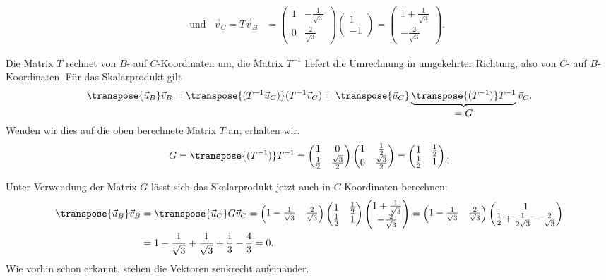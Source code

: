 \begin{loesung}
\begin{teilaufgaben}
\[\begin{aligned}
&
&\text{und}&
\vec v_C
=
T\vec v_B
&=
\begin{pmatrix}1&-\frac1{\sqrt{3}}\\0&\frac2{\sqrt{3}}\end{pmatrix}
\begin{pmatrix}1\\-1\end{pmatrix}
=
\begin{pmatrix} 1+\frac1{\sqrt{3}}\\-\frac2{\sqrt{3}} \end{pmatrix}.
\end{aligned}
\]
\item
Die Matrix $T$ rechnet von $B$- auf $C$-Koordinaten um, die Matrix $T^{-1}$
liefert die Umrechnung in umgekehrter Richtung, also von $C$- auf $B$-Koordinaten.
Für das Skalarprodukt gilt
\[
\transpose{\vec{u}_B} \vec v_B
=
\transpose{(T^{-1}\vec{u}_C)}(T^{-1}\vec v_C)
=
\transpose{\vec{u}_C}
\underbrace{ \transpose{(T^{-1})} T^{-1}}_{\displaystyle =G} \vec v_C.
\]
Wenden wir dies auf die oben berechnete Matrix $T$ an, erhalten wir:
\[
G
=
\transpose{(T^{-1})}T^{-1}
=
\begin{pmatrix}1&0\\\frac12&\frac{\sqrt{3}}2\end{pmatrix}
\begin{pmatrix}1&\frac12\\0&\frac{\sqrt{3}}2\end{pmatrix}
=
\begin{pmatrix} 1&\frac12\\\frac12&1 \end{pmatrix}.
\]
\item
Unter Verwendung der Matrix $G$ lässt sich das Skalarprodukt jetzt auch
in $C$-Koordinaten berechnen:
\begin{align*}
\transpose{\vec{u}_B} \vec v_B
&=
\transpose{\vec{u}_C} G \vec v_C
=
\begin{pmatrix} 1-\frac1{\sqrt{3}}&\frac2{\sqrt{3}} \end{pmatrix}
\begin{pmatrix} 1&\frac12\\\frac12&1 \end{pmatrix}
\begin{pmatrix} 1+\frac1{\sqrt{3}}\\-\frac2{\sqrt{3}} \end{pmatrix}
=
\begin{pmatrix} 1-\frac1{\sqrt{3}}&\frac2{\sqrt{3}} \end{pmatrix}
\begin{pmatrix} 1\\
\frac12+\frac1{2\sqrt{3}}-\frac2{\sqrt{3}}
\end{pmatrix}
\\
&=
1-\frac1{\sqrt{3}}
+
\frac1{\sqrt{3}}+\frac13-\frac43
=
0.
\end{align*}
Wie vorhin schon erkannt, stehen die Vektoren senkrecht aufeinander.
\qedhere
\end{teilaufgaben}
\end{loesung}

